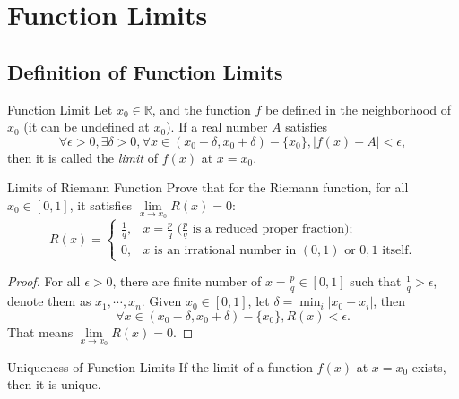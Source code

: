 
\section{Function Limits}

\subsection{Definition of Function Limits}

\begin{definition}{Function Limit}{}
  Let $x_0 \in \mathbb{R}$, and the function $f$ be defined in the neighborhood
  of $x_0$ (it can be undefined at $x_0$).
  If a real number $A$ satisfies
  \begin{equation}
    \forall \epsilon > 0, \exists \delta > 0, \forall x \in (x_0 - \delta, x_0 + \delta) - \{x_0\},
    |f(x) - A| < \epsilon,
  \end{equation}
  then it is called the \emph{limit} of $f(x)$ at $x = x_0$.
\end{definition}

\begin{example}{Limits of Riemann Function}{}
  Prove that for the Riemann function, for all $x_0 \in [0, 1]$,
  it satisfies $\lim \limits _{x \rightarrow x_0} R(x) = 0$:
  \begin{equation}
    R(x)= \begin{cases}
    \frac{1}{q}, & x = \frac{p}{q} \text{ ($\frac{p}{q}$ is a reduced proper fraction)}; \\
    0, & x \text{ is an irrational number in } (0,1) \text{ or } 0,1 \text{ itself}.
    \end{cases}
  \end{equation}
\end{example}

\begin{proof}
  For all $\epsilon > 0$, there are finite number of $x = \frac{p}{q} \in [0,
  1]$ such that $\frac{1}{q} > \epsilon$,
  denote them as $x_1,\cdots,x_n$.
  Given $x_0 \in [0, 1]$, let $\delta = \min_i |x_0 - x_i|$,
  then
  \begin{equation}
    \forall x \in (x_0 - \delta, x_0 + \delta) - \{x_0\},
    R(x) < \epsilon.
  \end{equation}
  That means $\lim \limits _{x \rightarrow x_0} R(x) = 0$.
\end{proof}

\begin{proposition}{Uniqueness of Function Limits}{}
  If the limit of a function $f(x)$ at $x = x_0$ exists, then it is unique.
\end{proposition}

